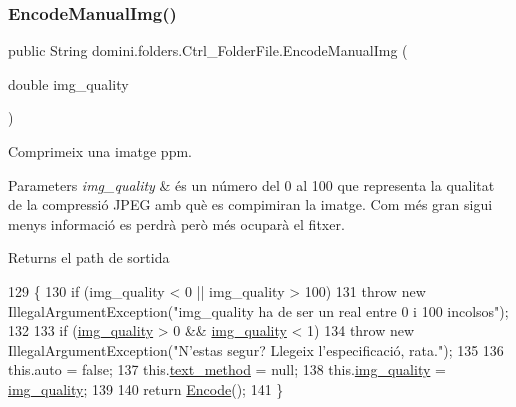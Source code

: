\subsubsection{\texorpdfstring{Encode\+Manual\+Img()}{EncodeManualImg()}}
{\footnotesize\ttfamily public String domini.\+folders.\+Ctrl\+\_\+\+Folder\+File.\+Encode\+Manual\+Img (\begin{DoxyParamCaption}\item[{double}]{img\+\_\+quality }\end{DoxyParamCaption})\hspace{0.3cm}{\ttfamily [inline]}}



Comprimeix una imatge ppm. 


\begin{DoxyParams}{Parameters}
{\em img\+\_\+quality} & és un número del 0 al 100 que representa la qualitat de la compressió J\+P\+EG amb què es compimiran la imatge. Com més gran sigui menys informació es perdrà però més ocuparà el fitxer. \\
\hline
\end{DoxyParams}
\begin{DoxyReturn}{Returns}
el path de sortida 
\end{DoxyReturn}

\begin{DoxyCode}
129                                                       \{
130         \textcolor{keywordflow}{if} (img\_quality < 0 || img\_quality > 100)
131             \textcolor{keywordflow}{throw} \textcolor{keyword}{new} IllegalArgumentException(\textcolor{stringliteral}{"img\_quality ha de ser un real entre 0 i 100 incolsos"});
132 
133         \textcolor{keywordflow}{if} (\hyperlink{classdomini_1_1folders_1_1Ctrl__FolderFile_a7990a74c394d53a58ebbf4a7872c700d}{img\_quality} > 0 && \hyperlink{classdomini_1_1folders_1_1Ctrl__FolderFile_a7990a74c394d53a58ebbf4a7872c700d}{img\_quality} < 1)
134             \textcolor{keywordflow}{throw} \textcolor{keyword}{new} IllegalArgumentException(\textcolor{stringliteral}{"N'estas segur? Llegeix l'especificació, rata."});
135 
136         this.\textcolor{keyword}{auto} = \textcolor{keyword}{false};
137         this.\hyperlink{classdomini_1_1folders_1_1Ctrl__FolderFile_a75ef571be454360b835f552d2cf20741}{text\_method} = null;
138         this.\hyperlink{classdomini_1_1folders_1_1Ctrl__FolderFile_a7990a74c394d53a58ebbf4a7872c700d}{img\_quality} = \hyperlink{classdomini_1_1folders_1_1Ctrl__FolderFile_a7990a74c394d53a58ebbf4a7872c700d}{img\_quality};
139 
140         \textcolor{keywordflow}{return} \hyperlink{classdomini_1_1folders_1_1Ctrl__FolderFile_a7c47fd5127ae6f713a4fa7f75002a6f6}{Encode}();
141     \}
\end{DoxyCode}
\mbox{\label{classdomini_1_1folders_1_1Ctrl__FolderFile_a77b9d8244dd36e77516a9dc43ec50ed8}} 
